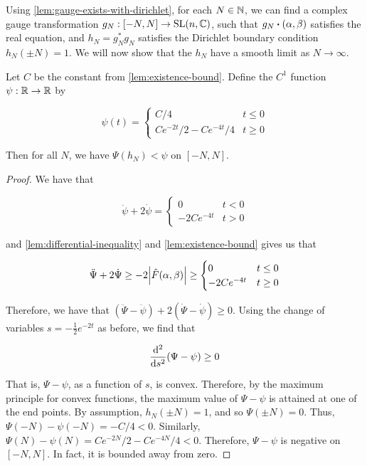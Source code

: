 \documentclass{report}
\begin{document}
Using \cref{lem:gauge-exists-with-dirichlet}, for each \(N \in \mathbb{N}\), we can find a complex gauge transformation \(g_N : [-N, N] \to \operatorname{SL}(n, \mathbb{C})\), such that \(g_N \vdot (\alpha, \beta)\) satisfies the real equation, and \(h_N = g_N^*g_N\) satisfies the Dirichlet boundary condition \(h_N(\pm N) = 1\). We will now show that the \(h_N\) have a smooth limit as \(N \to \infty\).

\begin{lemma}
    \label{lem:uniform-bound}
    Let \(C\) be the constant from \cref{lem:existence-bound}. Define the \(C^1\) function \(\psi : \mathbb{R} \to \mathbb{R}\) by

    \[\psi(t) = \begin{cases}
        C/4 & t \le 0 \\
        Ce^{-2t}/2 - Ce^{-4t}/4 & t \ge 0
    \end{cases}\]

    Then for all \(N\), we have \(\Psi(h_N) < \psi\) on \([-N, N]\).
\end{lemma}

\begin{proof}
    We have that

    \[\ddot \psi + 2\dot\psi = \begin{cases}
        0 & t < 0 \\
        -2Ce^{-4t} & t > 0
    \end{cases}\]

    and \cref{lem:differential-inequality} and \cref{lem:existence-bound} gives us that

    \[\ddot\Psi + 2\dot\Psi \ge -2\abs{\hat F(\alpha, \beta)} \ge \begin{cases}
        0 & t \le 0 \\
        -2Ce^{-4t} & t \ge 0
    \end{cases}\]

    Therefore, we have that \((\ddot\Psi - \ddot\psi) + 2(\dot\Psi - \dot\psi) \ge 0\). Using the change of variables \(s = -\frac12e^{-2t}\) as before, we find that

    \[\dv[2]{s}(\Psi - \psi) \ge 0\]

    That is, \(\Psi - \psi\), as a function of \(s\), is convex. Therefore, by the maximum principle for convex functions, the maximum value of \(\Psi - \psi\) is attained at one of the end points. By assumption, \(h_N(\pm N) = 1\), and so \(\Psi(\pm N) = 0\). Thus, \(\Psi(-N) - \psi(-N) = -C/4 < 0\). Similarly, \(\Psi(N) - \psi(N) = Ce^{-2N}/2 - Ce^{-4N}/4 < 0\). Therefore, \(\Psi - \psi\) is negative on \([-N, N]\). In fact, it is bounded away from zero.
\end{proof}
\end{document}
